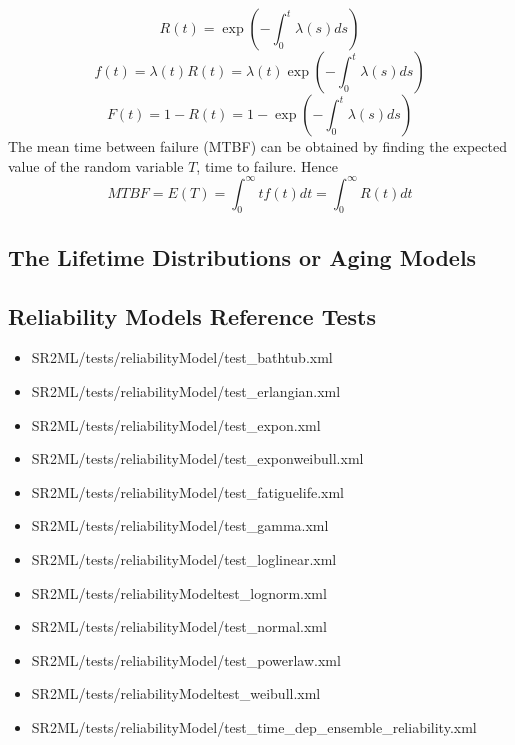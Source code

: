 \begin{equation}
  R(t) = \exp(-\int_{0}^{t} \lambda (s)ds)
\end{equation}
\begin{equation}
	f(t) = \lambda (t)R(t) = \lambda (t)\exp(-\int_{0}^{t} \lambda (s)ds)
\end{equation}
\begin{equation}
 	F(t) = 1 - R(t) = 1 - \exp(-\int_{0}^{t} \lambda (s)ds)
\end{equation}
The mean time between failure (MTBF) can be obtained by finding the expected value of the random variable
$T$, time to failure. Hence
\begin{equation}
  MTBF = E(T) = \int_{0}^{\infty} tf(t)dt = \int_{0}^{\infty} R(t)dt
\end{equation}

\subsection{The Lifetime Distributions or Aging Models}


\subsection{Reliability Models Reference Tests}
\begin{itemize}
	\item SR2ML/tests/reliabilityModel/test\_bathtub.xml
  \item SR2ML/tests/reliabilityModel/test\_erlangian.xml
	\item SR2ML/tests/reliabilityModel/test\_expon.xml
  \item SR2ML/tests/reliabilityModel/test\_exponweibull.xml
	\item SR2ML/tests/reliabilityModel/test\_fatiguelife.xml
  \item SR2ML/tests/reliabilityModel/test\_gamma.xml
	\item SR2ML/tests/reliabilityModel/test\_loglinear.xml
  \item SR2ML/tests/reliabilityModeltest\_lognorm.xml
	\item SR2ML/tests/reliabilityModel/test\_normal.xml
  \item SR2ML/tests/reliabilityModel/test\_powerlaw.xml
	\item SR2ML/tests/reliabilityModeltest\_weibull.xml
	\item SR2ML/tests/reliabilityModel/test\_time\_dep\_ensemble\_reliability.xml
\end{itemize}
